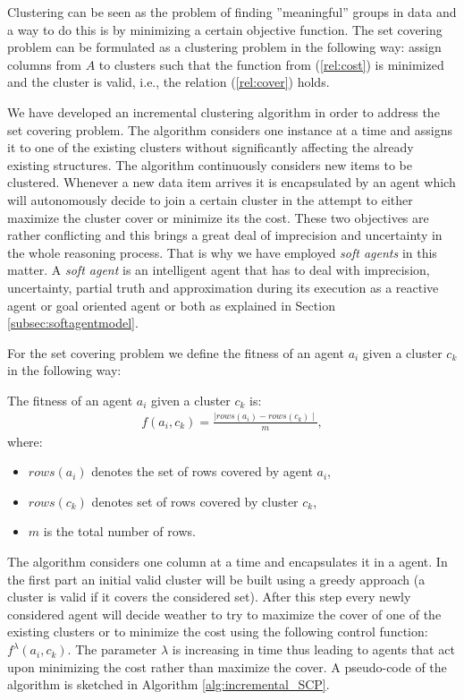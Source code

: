 Clustering can be seen as the problem of finding ''meaningful'' groups in data and a way to do this is by minimizing a certain objective function. 
The set covering problem can be formulated as a clustering problem in the following way: assign columns from $A$ to clusters such that the function from (\ref{rel:cost}) is minimized and the cluster is valid, i.e., the relation (\ref{rel:cover}) holds.

We have developed an incremental clustering algorithm in order to address the set covering problem. The algorithm considers one instance at a time and assigns it to one of the existing clusters without significantly affecting the already existing structures. The algorithm continuously considers new items to be clustered. Whenever a new data item arrives it is encapsulated by an agent which will autonomously decide to join a certain cluster in the attempt to either maximize the cluster cover or minimize its the cost. These two objectives are rather conflicting and this brings a great deal of imprecision and uncertainty in the whole reasoning process. That is why we have employed \emph{soft agents} in this matter. A \emph{soft agent} is an intelligent agent that has to deal with imprecision, uncertainty, partial truth and approximation during its execution as a reactive agent or goal oriented agent or both as explained in Section \ref{subsec:softagentmodel}.

For the set covering problem we define the fitness of an agent $a_{i}$ given a cluster $c_{k}$ in the following way:

\begin{definition}
The fitness of an agent $a_{i}$ given a cluster $c_{k}$ is:
\begin{align}
f(a_{i}, c_{k}) = \frac{\mid rows(a_{i}) - rows(c_{k}) \mid}{m},
\end{align}
where:
\begin{itemize}
\item $rows(a_{i})$ denotes the set of rows covered by agent $a_{i}$,
\item $rows(c_{k})$ denotes set of rows covered by cluster $c_{k}$,
\item $m$ is the total number of rows.
\end{itemize} 
\end{definition}

The algorithm considers one column at a time and encapsulates it in a agent. In the first part an initial valid cluster will be built using a greedy approach (a cluster is valid if it covers the considered set). After this step every newly considered agent will decide weather to try to maximize the cover of one of the existing clusters or to minimize the cost using the following control function: $f^{\lambda}(a_{i},c_{k})$. The parameter $\lambda$ is increasing in time thus leading to agents that act upon minimizing the cost rather than maximize the cover.
A pseudo-code of the algorithm is sketched in Algorithm \ref{alg:incremental_SCP}.


